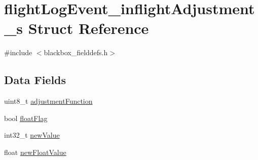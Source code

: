 \hypertarget{structflightLogEvent__inflightAdjustment__s}{\section{flight\+Log\+Event\+\_\+inflight\+Adjustment\+\_\+s Struct Reference}
\label{structflightLogEvent__inflightAdjustment__s}
}


{\ttfamily \#include $<$blackbox\+\_\+fielddefs.\+h$>$}

\subsection*{Data Fields}
\begin{DoxyCompactItemize}
\item 
uint8\+\_\+t \hyperlink{structflightLogEvent__inflightAdjustment__s_a0d0a74ba8f9f3f6b54ff2faaa9933095}{adjustment\+Function}
\item 
bool \hyperlink{structflightLogEvent__inflightAdjustment__s_a4ab23b4482356c6a7946652449a28056}{float\+Flag}
\item 
int32\+\_\+t \hyperlink{structflightLogEvent__inflightAdjustment__s_ad163fddf36f8efec9f24df44ff5e6729}{new\+Value}
\item 
float \hyperlink{structflightLogEvent__inflightAdjustment__s_a397ef9e6f767195fb6098282edd39208}{new\+Float\+Value}
\end{DoxyCompactItemize}


